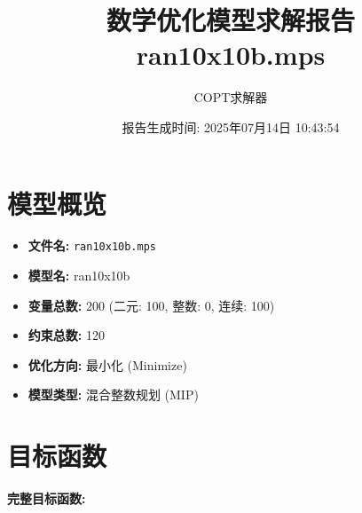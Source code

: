 \documentclass[a4paper,10pt]{article}
\title{数学优化模型求解报告\\{\large ran10x10b.mps}}
\author{COPT求解器}
\date{报告生成时间: 2025年07月14日 10:43:54}
\begin{document}
\maketitle
\tableofcontents
\newpage

\section{模型概览}
\begin{itemize}
    \item \textbf{文件名:} \texttt{ran10x10b.mps}
    \item \textbf{模型名:} ran10x10b
    \item \textbf{变量总数:} 200 (二元: 100, 整数: 0, 连续: 100)
    \item \textbf{约束总数:} 120
    \item \textbf{优化方向:} 最小化 (Minimize)
    \item \textbf{模型类型:} 混合整数规划 (MIP)
\end{itemize}
\section{目标函数}

\textbf{完整目标函数:}
\end{document}
